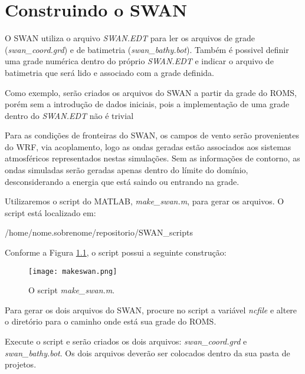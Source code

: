 \chapter{Construindo o SWAN}

\noindent O SWAN utiliza o arquivo \textit{SWAN.EDT} para ler os  arquivos de grade (\textit{swan\_coord.grd}) e
          de batimetria (\textit{swan\_bathy.bot}). Também é possivel definir uma grade numérica dentro do próprio
          \textit{SWAN.EDT} e indicar o arquivo de batimetria que será lido e associado com a grade definida.
\bigskip

\noindent Como exemplo, serão criados os arquivos do SWAN a partir da grade do ROMS, porém sem a introdução de dados iniciais, 
          pois a implementação de uma grade dentro do \textit{SWAN.EDT} não é trivial    
\bigskip

\noindent Para as condições de fronteiras do SWAN, os campos de vento serão provenientes do WRF, via acoplamento, logo
          as ondas geradas estão associados aos sistemas atmosféricos representados nestas simulações. Sem as informações 
          de contorno, as ondas simuladas serão geradas apenas dentro do límite do domínio, desconsiderando a energia que 
          está saindo ou entrando na grade.
\bigskip

\noindent Utilizaremos o script do MATLAB, \textit{make\_swan.m}, para gerar os arquivos. O script está localizado em:  
\bigskip

\begin{bashcode}
/home/nome.sobrenome/repositorio/SWAN_scripts
\end{bashcode}
\bigskip

\noindent Conforme a Figura \textcolor{bleu_cite}{\ref{makeswan}}, o script possui a seguinte construção:
\bigskip

\begin{figure}[H]
    \centering
    \captionsetup{justification=centering}
    \texttt{[image: makeswan.png]}
    \caption{O script \textit{make\_swan.m}.}
    \label{makeswan}
\end{figure}
\bigskip

\noindent Para gerar os dois arquivos do SWAN, procure no script a variável \textit{ncfile} e altere o diretório 
          para o caminho onde está sua grade do ROMS.
\bigskip

\noindent Execute o script e serão criados os dois arquivos: \textit {swan\_coord.grd} e \textit{swan\_bathy.bot}. 
           Os dois arquivos deverão ser colocados dentro da sua pasta de projetos.
\bigskip

